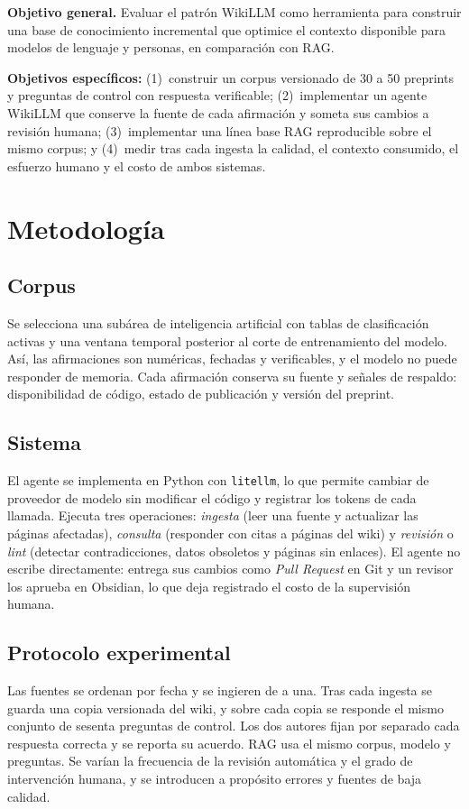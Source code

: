 \documentclass[11pt,letterpaper]{article}
\begin{document}
\noindent\textbf{Objetivo general.} Evaluar el patrón WikiLLM como herramienta para construir una
base de conocimiento incremental que optimice el contexto disponible para modelos de lenguaje y
personas, en comparación con RAG.

\textbf{Objetivos específicos:} (1)~construir un corpus versionado de 30 a 50 preprints y
preguntas de control con respuesta verificable; (2)~implementar un agente WikiLLM que conserve la
fuente de cada afirmación y someta sus cambios a revisión humana; (3)~implementar una línea base
RAG reproducible sobre el mismo corpus; y (4)~medir tras cada ingesta la calidad, el contexto
consumido, el esfuerzo humano y el costo de ambos sistemas.

\section{Metodología}

\subsection{Corpus}
Se selecciona una subárea de inteligencia artificial con tablas de clasificación activas y una
ventana temporal posterior al corte de entrenamiento del modelo. Así, las afirmaciones son
numéricas, fechadas y verificables, y el modelo no puede responder de memoria. Cada afirmación conserva su fuente y señales
de respaldo: disponibilidad de código, estado de publicación y versión del preprint.

\subsection{Sistema}
El agente se implementa en Python con \texttt{litellm}, lo que permite cambiar de proveedor de
modelo sin modificar el código y registrar los tokens de cada llamada. Ejecuta tres operaciones:
\textit{ingesta} (leer una fuente y actualizar las páginas afectadas), \textit{consulta}
(responder con citas a páginas del wiki) y \textit{revisión} o \textit{lint} (detectar
contradicciones, datos obsoletos y páginas sin enlaces). El agente no escribe directamente: entrega
sus cambios como \textit{Pull Request} en Git y un revisor los aprueba en Obsidian, lo que deja
registrado el costo de la supervisión humana.

\subsection{Protocolo experimental}
Las fuentes se ordenan por fecha y se ingieren de a una. Tras cada ingesta se guarda una copia
versionada del wiki, y sobre cada copia se responde el mismo conjunto de sesenta preguntas de
control. Los dos autores fijan por separado cada respuesta correcta y se reporta su acuerdo. RAG usa el
mismo corpus, modelo y preguntas. Se varían la frecuencia de la revisión automática y el grado de
intervención humana, y se introducen a propósito errores y fuentes de baja calidad.
\end{document}
